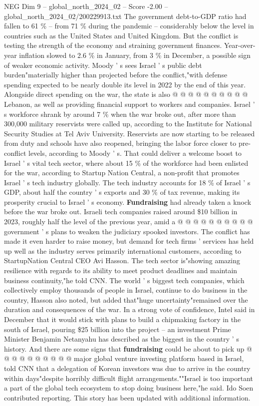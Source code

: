\begin{textsample}{NEG Dim 9 – global\_north\_2024\_02 – Score -2.00 – global\_north\_2024\_02/200229913.txt}
The government debt-to-GDP ratio had fallen to 61 \% -- from 71 \% during the pandemic -- considerably below the level in countries such as the United States and United Kingdom.
But the conflict is testing the strength of the economy and straining government finances.
Year-over-year inflation slowed to 2.6 \% in January, from 3 \% in December, a possible sign of weaker economic activity.
Moody ' s sees Israel ' s public debt burden"materially higher than projected before the conflict,"with defense spending expected to be nearly double its level in 2022 by the end of this year.
Alongside direct spending on the war, the state is also @ @ @ @ @ @ @ @ @ @ Lebanon, as well as providing financial support to workers and companies.
Israel ' s workforce shrank by around 7 \% when the war broke out, after more than 300,000 military reservists were called up, according to the Institute for National Security Studies at Tel Aviv University.
Reservists are now starting to be released from duty and schools have also reopened, bringing the labor force closer to pre-conflict levels, according to Moody ' s.
That could deliver a welcome boost to Israel ' s vital tech sector, where about 15 \% of the workforce had been enlisted for the war, according to Startup Nation Central, a non-profit that promotes Israel ' s tech industry globally.
The tech industry accounts for 18 \% of Israel ' s GDP, about half the country ' s exports and 30 \% of tax revenue, making its prosperity crucial to Israel ' s economy. \textbf{Fundraising} had already taken a knock before the war broke out.
Israeli tech companies raised around \$10 billion in 2023, roughly half the level of the previous year, amid a @ @ @ @ @ @ @ @ @ @ government ' s plans to weaken the judiciary spooked investors.
The conflict has made it even harder to raise money, but demand for tech firms ' services has held up well as the industry serves primarily international customers, according to StartupNation Central CEO Avi Hasson.
The tech sector is"showing amazing resilience with regards to its ability to meet product deadlines and maintain business continuity,"he told CNN.
The world ' s biggest tech companies, which collectively employ thousands of people in Israel, continue to do business in the country, Hasson also noted, but added that"huge uncertainty"remained over the duration and consequences of the war.
In a strong vote of confidence, Intel said in December that it would stick with plans to build a chipmaking factory in the south of Israel, pouring \$25 billion into the project -- an investment Prime Minister Benjamin Netanyahu has described as the biggest in the country ' s history.
And there are some signs that \textbf{fundraising} could be about to pick up @ @ @ @ @ @ @ @ @ @ major global venture investing platform based in Israel, told CNN that a delegation of Korean investors was due to arrive in the country within days"despite horribly difficult flight arrangements.""Israel is too important a part of the global tech ecosystem to stop doing business here,"he said.
Ido Soen contributed reporting.
This story has been updated with additional information.

\end{textsample}
